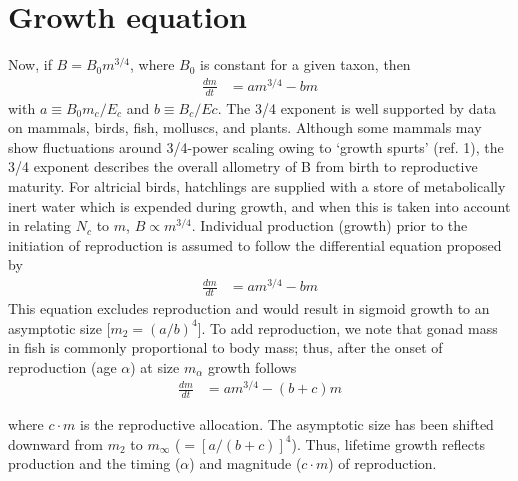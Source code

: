 \documentclass[a4paper]{article} %
\begin{document}
\section{Growth equation}
Now, if $B = B_{0}m^{3/4}$, where $B_0$ is constant for a given taxon, then
\begin{align}
    \frac{dm}{dt} &= am^{3/4} - bm
\end{align}
with $a \equiv B_{0}m_{c}/E_{c}$ and $b \equiv B_{c}/E{c}$. The 3/4 exponent is well supported by data on mammals, birds, fish, molluscs, and plants.
Although some mammals may show fluctuations around 3/4-power scaling owing to `growth spurts' (ref. 1), the 3/4 exponent describes the overall allometry of B from birth to reproductive maturity. For altricial birds, hatchlings are supplied with a store of metabolically inert water which is expended during growth, and when this is taken into account in relating $N_c$ to $m$, $B \propto m^{3/4}$.
Individual production (growth) prior to the initiation of reproduction is assumed to follow the differential equation proposed by \cite{West2001}
\begin{align}
    \frac{dm}{dt} &= am^{3/4} - bm
\end{align}
This equation excludes reproduction and would result in sigmoid growth to an asymptotic size [$m_{2} = (a/b)^{4}$]. To add reproduction, we note that gonad mass in fish is commonly proportional to body mass; thus, after the onset of reproduction (age $\alpha$) at size $m_{\alpha}$ growth follows
\begin{align}
    \frac{dm}{dt} &= am^{3/4} - (b+c)m
\end{align}


where $c \cdot m$ is the reproductive allocation. The asymptotic size has been shifted downward from $m_2$ to $m_{\infty}$ ($= [a/(b+c)]^4$). Thus, lifetime growth reflects production and the timing ($\alpha$) and magnitude ($c\cdot{m}$) of reproduction.
\end{document}
